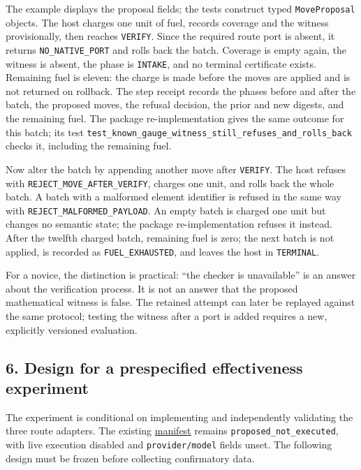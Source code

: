\documentclass[
  11pt,
]{article}
\newcommand{\passthrough}[1]{#1}
\begin{document}
The example displays the proposal fields; the tests construct typed
\passthrough{\lstinline!MoveProposal!} objects. The host charges one
unit of fuel, records coverage and the witness provisionally, then
reaches \passthrough{\lstinline!VERIFY!}. Since the required route port
is absent, it returns \nolinkurl{NO_NATIVE_PORT} and rolls back the
batch. Coverage is empty again, the witness is absent, the phase is
\passthrough{\lstinline!INTAKE!}, and no terminal certificate exists.
Remaining fuel is eleven: the charge is made before the moves are
applied and is not returned on rollback. The step receipt records the
phases before and after the batch, the proposed moves, the refusal
decision, the prior and new digests, and the remaining fuel. The package
re-implementation gives the same outcome for this batch; its test
\nolinkurl{test_known_gauge_witness_still_refuses_and_rolls_back} checks
it, including the remaining fuel.

Now alter the batch by appending another move after
\passthrough{\lstinline!VERIFY!}. The host refuses with
\nolinkurl{REJECT_MOVE_AFTER_VERIFY}, charges one unit, and rolls back
the whole batch. A batch with a malformed element identifier is refused
in the same way with \nolinkurl{REJECT_MALFORMED_PAYLOAD}. An empty
batch is charged one unit but changes no semantic state; the package
re-implementation refuses it instead. After the twelfth charged batch,
remaining fuel is zero; the next batch is not applied, is recorded as
\nolinkurl{FUEL_EXHAUSTED}, and leaves the host in
\passthrough{\lstinline!TERMINAL!}.

For a novice, the distinction is practical: ``the checker is
unavailable'' is an answer about the verification process. It is not an
answer that the proposed mathematical witness is false. The retained
attempt can later be replayed against the same protocol; testing the
witness after a port is added requires a new, explicitly versioned
evaluation.

\subsection{6. Design for a prespecified effectiveness
experiment}\label{design-for-a-prespecified-effectiveness-experiment}

The experiment is conditional on implementing and independently
validating the three route adapters. The existing
\href{demos/demo_3/experiment_manifest.yaml}{manifest} remains
\nolinkurl{proposed_not_executed}, with live execution disabled and
\nolinkurl{provider/model} fields unset. The following design must be
frozen before collecting confirmatory data.
\end{document}
